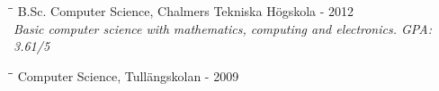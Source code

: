 \documentclass[11pt]{res}
\begin{document}
\begin{resume}
\vspace{-45pt}

	\begin{tabbing}
		\hspace{2.3in}\= \hspace{2.6in}\= \kill 
	 	B.Sc. Computer Science, Chalmers Tekniska Högskola \>  - 2012 \\
		\textit{Basic computer science with mathematics, computing and electronics. GPA: 3.61/5} \\

	\end{tabbing}

\vspace{-45pt}

       \begin{tabbing}
       		\hspace{2.3in}\= \hspace{2.6in}\= \kill
   		Computer Science, Tullängskolan \>  - 2009 
       \end{tabbing}


\end{resume}
\end{document}
